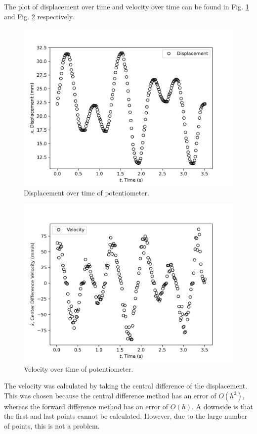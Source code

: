 \subsection{}

The plot of displacement over time and velocity over time can be found in Fig. \ref{fig:Q1d-displacement} and Fig. \ref{fig:Q1d-velocity} respectively.

\begin{figure}[h]
    \centering
    \includegraphics[width=0.8\linewidth]{matplotlib/Q1cDisplacement.png}
    \caption{Displacement over time of potentiometer.}
    \label{fig:Q1d-displacement}
\end{figure}

\begin{figure}[h]
    \centering
    \includegraphics[width=0.8\linewidth]{matplotlib/Q1cVelocity.png}
    \caption{Velocity over time of potentiometer.}
    \label{fig:Q1d-velocity}
\end{figure}

The velocity was calculated by taking the central difference of the displacement. This was chosen because
the central difference method has an error of $O(h^2)$, whereas the forward difference method has an error of $O(h)$. A downside
is that the first and last points cannot be calculated. However, due to the large number of points, this is not a problem.


    